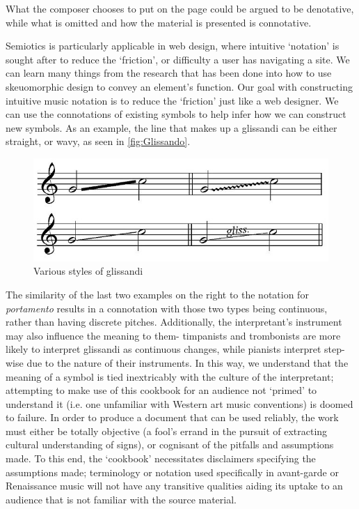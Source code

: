 What the composer chooses to put on the page could be argued to be denotative, while what is omitted and how the material is presented is connotative.


Semiotics is particularly applicable in web design, where intuitive `notation' is sought after to reduce the `friction', or difficulty a user has navigating a site.
We can learn many things from the research that has been done into how to use skeuomorphic design to convey an element's function.
Our goal with constructing intuitive music notation is to reduce the `friction' just like a web designer.
We can use the connotations of existing symbols to help infer how we can construct new symbols.
As an example, the line that makes up a glissandi can be either straight, or wavy, as seen in \autoref{fig:Glissando}.
\begin{figure}
    \includegraphics[]{./resources/glissando.jpg}
\caption{Various styles of glissandi}\label{fig:Glissando}
\end{figure}
The similarity of the last two examples on the right to the notation for \emph{portamento} results in a connotation with those two types being continuous, rather than having discrete pitches.
Additionally, the interpretant's instrument may also influence the meaning to them- timpanists and trombonists are more likely to interpret glissandi as continuous changes, while pianists interpret step-wise due to the nature of their instruments.\autocite[]{}
In this way, we understand that the meaning of a symbol is tied inextricably with the culture of the interpretant; attempting to make use of this cookbook for an audience not `primed' to understand it (i.e. one unfamiliar with Western art music conventions) is doomed to failure.
In order to produce a document that can be used reliably, the work must either be totally objective (a fool's errand in the pursuit of extracting cultural understanding of signs), or cognisant of the pitfalls and assumptions made.
To this end, the `cookbook' necessitates disclaimers specifying the assumptions made; terminology or notation used specifically in avant-garde or Renaissance music will not have any transitive qualities aiding its uptake to an audience that is not familiar with the source material.


